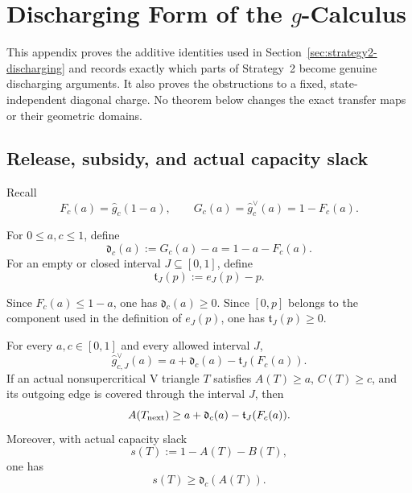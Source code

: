 \section{Discharging Form of the \(g\)-Calculus}
\label{sec:strategy2-discharging-calculus}

This appendix proves the additive identities used in
Section~\ref{sec:strategy2-discharging} and records exactly which parts of
Strategy~2 become genuine discharging arguments.  It also proves the
obstructions to a fixed, state-independent diagonal charge.  No theorem below
changes the exact transfer maps or their geometric domains.

\subsection{Release, subsidy, and actual capacity slack}

Recall
\[
 F_c(a)=\widehat g_c(1-a),
 \qquad
 G_c(a)=\widehat g_c^\vee(a)=1-F_c(a).
\]

\begin{definition}
\label{def:appendix-release-subsidy}
For \(0\le a,c\le1\), define
\begin{equation}
 \mathfrak d_c(a):=G_c(a)-a=1-a-F_c(a).
 \label{eq:appendix-release}
\end{equation}
For an empty or closed interval \(J\subseteq[0,1]\), define
\begin{equation}
 \mathfrak t_J(p):=e_J(p)-p.
 \label{eq:appendix-subsidy}
\end{equation}
\end{definition}

Since \(F_c(a)\le1-a\), one has \(\mathfrak d_c(a)\ge0\).  Since
\([0,p]\) belongs to the component used in the definition of \(e_J(p)\), one
has \(\mathfrak t_J(p)\ge0\).

\begin{proposition}
\label{prop:appendix-local-balance}
For every \(a,c\in[0,1]\) and every allowed interval \(J\),
\begin{equation}
 \widehat g_{c,J}^\vee(a)
 =a+\mathfrak d_c(a)-\mathfrak t_J(F_c(a)).
 \label{eq:appendix-local-balance}
\end{equation}
If an actual nonsupercritical V triangle \(T\) satisfies
\(A(T)\ge a\), \(C(T)\ge c\), and its outgoing edge is covered through the
interval \(J\), then
\begin{equation}
 A(T_{\rm next})
 \ge a+\mathfrak d_c(a)-\mathfrak t_J(F_c(a)).
 \label{eq:appendix-actual-local-balance}
\end{equation}
Moreover, with actual capacity slack
\[
 s(T):=1-A(T)-B(T),
\]
one has
\begin{equation}
 s(T)\ge\mathfrak d_c(A(T)).
 \label{eq:appendix-slack-release}
\end{equation}
\end{proposition}

